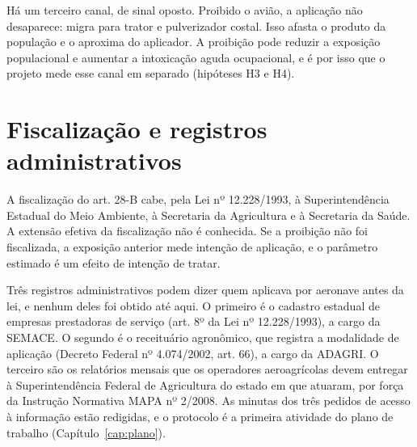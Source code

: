 Há um terceiro canal, de sinal oposto. Proibido o avião, a aplicação não
desaparece: migra para trator e pulverizador costal. Isso afasta o produto da
população e o aproxima do aplicador. A proibição pode reduzir a exposição
populacional e aumentar a intoxicação aguda ocupacional, e é por isso que o
projeto mede esse canal em separado (hipóteses H3 e H4).

\section{Fiscalização e registros administrativos}
\label{sec:fiscalizacao}

A fiscalização do art. 28-B cabe, pela Lei nº 12.228/1993, à Superintendência
Estadual do Meio Ambiente, à Secretaria da Agricultura e à Secretaria da Saúde.
A extensão efetiva da fiscalização não é conhecida. Se a proibição não foi
fiscalizada, a exposição anterior mede intenção de aplicação, e o parâmetro
estimado é um efeito de intenção de tratar.

Três registros administrativos podem dizer quem aplicava por aeronave antes da
lei, e nenhum deles foi obtido até aqui. O primeiro é o cadastro estadual de
empresas prestadoras de serviço (art. 8º da Lei nº 12.228/1993), a cargo da
SEMACE. O segundo é o receituário agronômico, que registra a modalidade de
aplicação (Decreto Federal nº 4.074/2002, art. 66), a cargo da ADAGRI. O
terceiro são os relatórios mensais que os operadores aeroagrícolas devem
entregar à Superintendência Federal de Agricultura do estado em que atuaram,
por força da Instrução Normativa MAPA nº 2/2008. As minutas dos três pedidos de
acesso à informação estão redigidas, e o protocolo é a primeira atividade do
plano de trabalho (Capítulo~\ref{cap:plano}).
